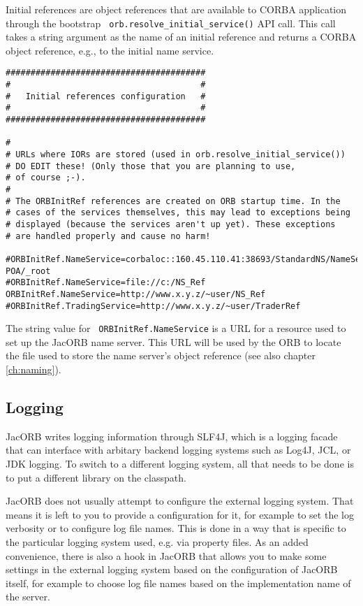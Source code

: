 {{Initial references are object references that are available to CORBA
application through the bootstrap {\tt
  orb.resolve\_initial\_service()} API call. This call takes a string
argument as the name of an initial reference and returns a CORBA
object reference, e.g., to the initial name service.

\renewcommand{\baselinestretch}{0.9}
\small{
\begin{verbatim}
########################################
#                                      #
#   Initial references configuration   #
#                                      #
########################################

#
# URLs where IORs are stored (used in orb.resolve_initial_service())
# DO EDIT these! (Only those that you are planning to use,
# of course ;-).
#
# The ORBInitRef references are created on ORB startup time. In the
# cases of the services themselves, this may lead to exceptions being
# displayed (because the services aren't up yet). These exceptions
# are handled properly and cause no harm!

#ORBInitRef.NameService=corbaloc::160.45.110.41:38693/StandardNS/NameServer-POA/_root
#ORBInitRef.NameService=file://c:/NS_Ref
ORBInitRef.NameService=http://www.x.y.z/~user/NS_Ref
#ORBInitRef.TradingService=http://www.x.y.z/~user/TraderRef
\end{verbatim}
}
\renewcommand{\baselinestretch}{1.0}
\small\normalsize

The  string value  for  {\tt
ORBInitRef.NameService} is  a URL  for a resource  used to set  up the
JacORB name  server. This URL  will be used  by the ORB to  locate the
file  used to  store  the  name server's  object  reference (see  also
chapter \ref{ch:naming}).

\subsection{Logging}

JacORB writes logging information through SLF4J, which is a logging
facade that can interface with arbitary backend logging systems such
as Log4J, JCL, or JDK logging.  To switch to a different logging
system, all that needs to be done is to put a different library on the
classpath.

JacORB does not usually attempt to configure the external logging
system.  That means it is left to you to provide a configuration for
it, for example to set the log verbosity or to configure log file
names.  This is done in a way that is specific to the particular
logging system used, e.g. via property files.  As an added
convenience, there is also a hook in JacORB that allows you to make
some settings in the external logging system based on the
configuration of JacORB itself, for example to choose log file names
based on the implementation name of the server.

}}
